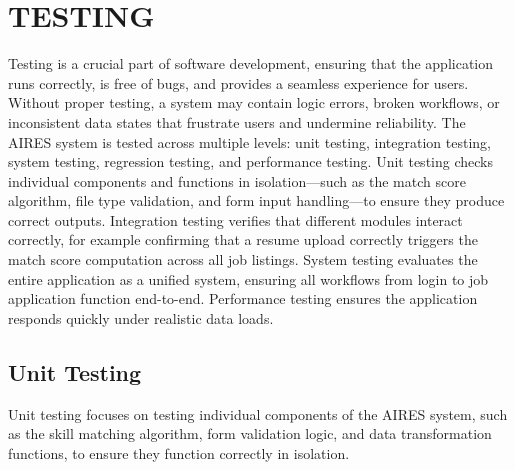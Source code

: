 \chapter{TESTING}
Testing is a crucial part of software development, ensuring that the application runs correctly, is free of bugs, and provides a seamless experience for users. Without proper testing, a system may contain logic errors, broken workflows, or inconsistent data states that frustrate users and undermine reliability. The AIRES system is tested across multiple levels: unit testing, integration testing, system testing, regression testing, and performance testing.  
\noindent
Unit testing checks individual components and functions in isolation---such as the match score algorithm, file type validation, and form input handling---to ensure they produce correct outputs. Integration testing verifies that different modules interact correctly, for example confirming that a resume upload correctly triggers the match score computation across all job listings. System testing evaluates the entire application as a unified system, ensuring all workflows from login to job application function end-to-end. Performance testing ensures the application responds quickly under realistic data loads.

\section{Unit Testing}
Unit testing focuses on testing individual components of the AIRES system, such as the skill matching algorithm, form validation logic, and data transformation functions, to ensure they function correctly in isolation.



\renewcommand{\arraystretch}{1.3}

